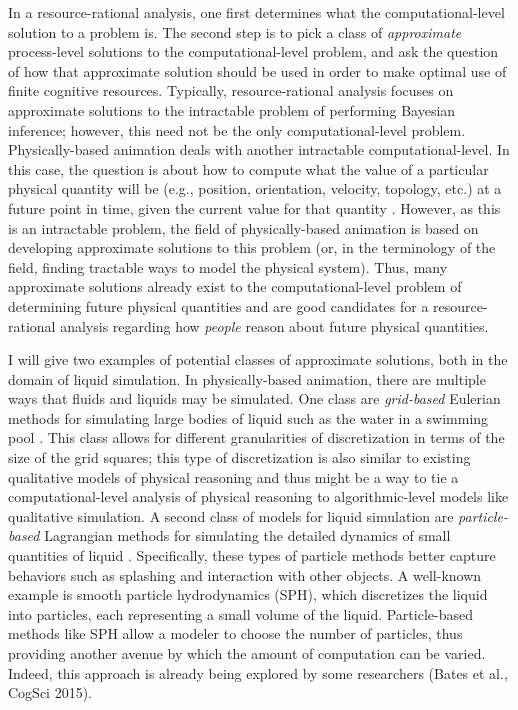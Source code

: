 \documentclass[12pt]{article}
\begin{document}
In a resource-rational analysis, one first determines what the computational-level solution to a problem is. The second step is to pick a class of \textit{approximate} process-level solutions to the computational-level problem, and ask the question of how that approximate solution should be used in order to make optimal use of finite cognitive resources. Typically, resource-rational analysis focuses on approximate solutions to the intractable problem of performing Bayesian inference; however, this need not be the only computational-level problem. Physically-based animation deals with another intractable computational-level. In this case, the question is about how to compute what the value of a particular physical quantity will be (e.g., position, orientation, velocity, topology, etc.) at a future point in time, given the current value for that quantity \citep{Witkin1997}. However, as this is an intractable problem, the field of physically-based animation is based on developing approximate solutions to this problem (or, in the terminology of the field, finding tractable ways to model the physical system). Thus, many approximate solutions already exist to the computational-level problem of determining future physical quantities and are good candidates for a resource-rational analysis regarding how \textit{people} reason about future physical quantities.

I will give two examples of potential classes of approximate solutions, both in the domain of liquid simulation. In physically-based animation, there are multiple ways that fluids and liquids may be simulated. One class are \textit{grid-based} Eulerian methods for simulating large bodies of liquid such as the water in a swimming pool \citep{Stam1999}. This class allows for different granularities of discretization in terms of the size of the grid squares; this type of discretization is also similar to existing qualitative models of physical reasoning \citep{Forbus2011} and thus might be a way to tie a computational-level analysis of physical reasoning to algorithmic-level models like qualitative simulation. A second class of models for liquid simulation are \textit{particle-based} Lagrangian methods for simulating the detailed dynamics of small quantities of liquid \citep{Muller2003}. Specifically, these types of particle methods better capture behaviors such as splashing and interaction with other objects. A well-known example is smooth particle hydrodynamics (SPH), which discretizes the liquid into particles, each representing a small volume of the liquid. Particle-based methods like SPH allow a modeler to choose the number of particles, thus providing another avenue by which the amount of computation can be varied. Indeed, this approach is already being explored by some researchers (Bates et al., CogSci 2015).
\end{document}
